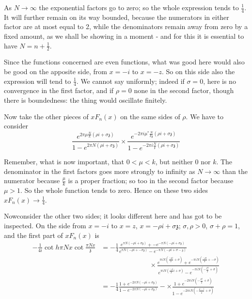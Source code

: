 As $N \to \infty$ the exponential factors go to zero; so the whole
expression tends to $\frac{1}{4}$. It will further remain on its way
bounded, because the numerators in either factor are at most equal to
2, while the denominators remain away from zero by a fixed amount, as
we shall be showing in a moment - and for this it is essential to have
$N= n+ \frac{1}{2}$. 

Since the functions concerned are even functions, what was good here
would also be good on the apposite side, from $x=- i$ to $x=-z$. So on
this side also the expression will tend to $\frac{1}{4}$. We cannot
say uniformly; indeed if $\sigma=0$, here is no convergence in the
first factor, and if $\rho =0$ none in the second factor, though there
is boundedness: the thing would oscillate finitely.

Now take the other pieces of $x F_n (x)$ on the same sides of
$\rho$. We have to consider
$$
\frac{e^{2 \pi \mu \frac{N}{k} (\rho i + \sigma \mathfrak{z})}}{1-
  e^{2 \pi N (\rho i + \sigma \mathfrak{z})}} \times \frac{e^{- 2 \pi
    i \mu^* \frac{N}{k \mathfrak{z}} (\rho i +\sigma
    \mathfrak{z})}}{1- e^{-2 \pi i \frac{N}{\mathfrak{z}} (\rho i +
    \sigma \mathfrak{z})}}
$$

Remember, what is now important, that $0< \mu < k$, but neither 0 nor
$k$. The denominator in the first factors goes more strongly to
infinity as $N \to \infty$ than the numerator because $\frac{\mu}{k}$
is a proper fraction; so too in the second factor because $\mu >
1$. So the whole function tends to zero. Hence on these two sides $x
F_n (x) \to \frac{1}{4}$. 

Now\pageoriginale consider the other two sides; it looks different
here and has got to be inspected. On the side from $x= -i$ to $x= z$,
$x= - \rho i + \sigma \mathfrak{z}$; $\sigma, \rho > 0$, $\sigma+ \rho
=1$, and the first part of $xF_n(x)$ is 
\begin{align*}
  - \frac{1}{4i} \cot h \pi N x \cot \frac{\pi N x}{\mathfrak{z}} & =
  - \frac{1}{4} \frac{e^{ \pi N (- \rho i + \sigma \mathfrak{z})} +
  - e^{- \pi N( - \rho i + \sigma \mathfrak{z})}}{e^{\pi N(- \rho i +
  - \sigma \mathfrak{z})}- e^{- \pi N (- \rho i + \sigma
  - \mathfrak{z})}}\\
  & \hspace{3cm}\times \frac{e^{ \pi i N \left( \frac{-\rho i}{\mathfrak{z}} +
   \sigma\right)} + e^{- \pi i N \left( \frac{-\rho i}{\mathfrak{z}} +
  - \sigma\right)}}{e^{\pi i N \left( \frac{-\rho}{\mathfrak{z}} i +
   \sigma \right)} - e^{- \pi i N \left( -\frac{\rho i}{\mathfrak{z}}
   + \sigma\right)}}\\
  & = - \frac{1}{4} \frac{1+ e^{- 2 \pi N (-\rho i + \sigma
  \mathfrak{z})}}{1- e^{- 2 \pi N (- \rho i + \sigma \mathfrak{z})}}
  - \times \frac{1+ e^{-2 \pi i N \left( - \frac{\rho i}{\mathfrak{z}}
  + \sigma \right)}}{1- e^{- 2 \pi i N \left(- \frac{\rho
  - i}{\mathfrak{z}} + \sigma \right)}}
\end{align*}


